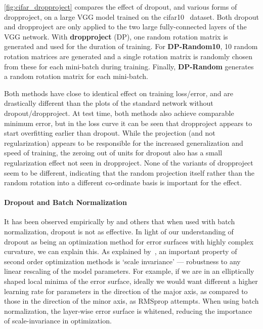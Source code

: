 \documentclass[thesis]{subfiles}
\begin{document}
\cref{fig:cifar_dropproject} compares the effect of dropout, and various forms of dropproject, on a large VGG model trained on the \gls{cifar10}~\citep{CIFAR10} dataset. Both dropout and dropproject are only applied to the two large fully-connected layers of the VGG network. With \textbf{dropproject} (DP), one random rotation matrix is generated and used for the duration of training. For \textbf{DP-Random10}, 10 random rotation matrices are generated and a single rotation matrix is randomly chosen from these for each mini-batch during training. Finally, \textbf{DP-Random} generates a random rotation matrix for each mini-batch.

Both methods have close to identical effect on training loss/error, and are drastically different than the plots of the standard network without dropout/dropproject. At test time, both methods also achieve comparable minimum error, but in the loss curve it can be seen that dropproject appears to start overfitting earlier than dropout. While the projection (and not regularization) appears to be responsible for the increased generalization and speed of training, the zeroing out of units for dropout also has a small regularization effect not seen in dropproject. None of the variants of dropproject seem to be different, indicating that the random projection itself rather than the random rotation into a different co-ordinate basis is important for the effect.

\paragraph{Dropout and Batch Normalization}
It has been observed empirically by \citet{Ioffe2015} and others that when used with batch normalization, dropout is not as effective. In light of our understanding of dropout as being an optimization method for error surfaces with highly complex curvature, we can explain this. As explained by~\citep{martens2010deep}, an important property of second order optimization methods is `scale invariance' --- robustness to any linear rescaling of the model parameters. For example, if we are in an elliptically shaped local minima of the error surface, ideally we would want different a higher learning rate for parameters in the direction of the major axis, as compared to those in the direction of the minor axis, as RMSprop attempts. When using batch normalization, the layer-wise error surface is whitened, reducing the importance of scale-invariance in optimization.
\end{document}
